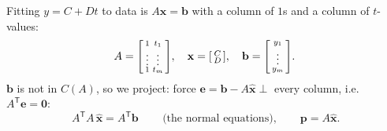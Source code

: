 \documentclass[aspectratio=169, 11pt]{beamer}
\newcommand{\xx}{\mathbf{x}}
\newcommand{\bb}{\mathbf{b}}
\newcommand{\pp}{\mathbf{p}}
\newcommand{\ee}{\mathbf{e}}
\newcommand{\zero}{\mathbf{0}}
\newcommand{\T}{\mathsf{T}}
\begin{document}
\begin{frame}[t, plain]
  Fitting $y=C+Dt$ to data is $A\xx=\bb$ with a column of $1$s and a column of $t$-values:
  \[
    A=\begin{bsmallmatrix} 1 & t_1\\ \vdots & \vdots\\ 1 & t_m \end{bsmallmatrix},\quad
    \xx=\begin{bsmallmatrix} C\\ D \end{bsmallmatrix},\quad \bb=\begin{bsmallmatrix} y_1\\ \vdots\\ y_m \end{bsmallmatrix}.
  \]
  $\bb$ is not in $C(A)$, so we project: force $\ee=\bb-A\hat{\xx}\perp$ every column, i.e. $A^{\T}\ee=\zero$:
  \[
    \boxed{\,A^{\T}A\,\hat{\xx}=A^{\T}\bb\,}\qquad\text{(the normal equations)},\qquad \pp=A\hat{\xx}.
  \]
\end{frame}
\end{document}
